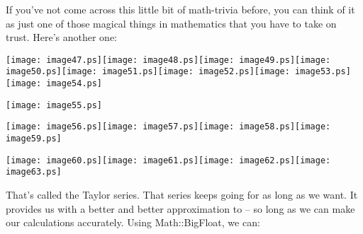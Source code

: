 \documentclass[a4paper,11pt]{book}
\begin{document}
\noindent 

\noindent 

\noindent If you've not come across this little bit of math-trivia before, you can think of it as just one of those magical things in mathematics that you have to take on trust. Here's another one:

\noindent 

\noindent \texttt{[image: image47.ps]}\texttt{[image: image48.ps]}\texttt{[image: image49.ps]}\texttt{[image: image50.ps]}\texttt{[image: image51.ps]}\texttt{[image: image52.ps]}\texttt{[image: image53.ps]}\texttt{[image: image54.ps]}

\noindent \texttt{[image: image55.ps]}

\noindent \texttt{[image: image56.ps]}\texttt{[image: image57.ps]}\texttt{[image: image58.ps]}\texttt{[image: image59.ps]}

\noindent \texttt{[image: image60.ps]}\texttt{[image: image61.ps]}\texttt{[image: image62.ps]}\texttt{[image: image63.ps]}

\noindent 

\noindent That's called the Taylor series. That series keeps going for as long as we want. It provides us with a better and better approximation to  -- so long as we can make our calculations accurately. Using Math::BigFloat, we can:
\end{document}
